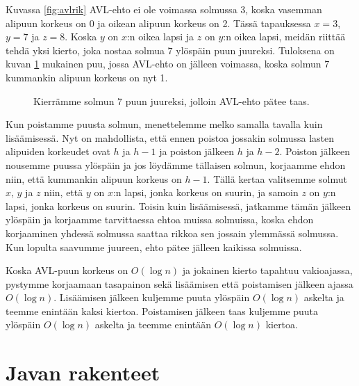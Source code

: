 Kuvassa \ref{fig:avlrik} AVL-ehto ei ole voimassa solmussa $3$,
koska vasemman alipuun korkeus on 0 ja oikean alipuun korkeus on 2.
Tässä tapauksessa $x=3$, $y=7$ ja $z=8$.
Koska $y$ on $x$:n oikea lapsi ja $z$ on $y$:n oikea lapsi,
meidän riittää tehdä yksi kierto, joka nostaa solmua $7$ ylöspäin
puun juureksi.
Tuloksena on kuvan \ref{fig:avlkor} mukainen puu, jossa
AVL-ehto on jälleen voimassa,
koska solmun $7$ kummankin alipuun korkeus on nyt 1.

\begin{figure}
\center
{}
\caption{Kierrämme solmun $7$ puun juureksi, jolloin AVL-ehto pätee taas.}
\label{fig:avlkor}
\end{figure}

Kun poistamme puusta solmun, menettelemme melko samalla tavalla
kuin lisäämisessä.
Nyt on mahdollista, että ennen poistoa
jossakin solmussa lasten alipuiden korkeudet ovat $h$ ja $h-1$
ja poiston jälkeen $h$ ja $h-2$.
Poiston jälkeen nousemme puussa ylöspäin ja jos löydämme
tällaisen solmun, korjaamme ehdon niin, että kummankin alipuun
korkeus on $h-1$.
Tällä kertaa valitsemme solmut $x$, $y$ ja $z$ niin,
että $y$ on $x$:n lapsi, jonka korkeus on suurin,
ja samoin $z$ on $y$:n lapsi, jonka korkeus on suurin.
Toisin kuin lisäämisessä, jatkamme tämän jälkeen ylöspäin
ja korjaamme tarvittaessa ehtoa muissa solmuissa,
koska ehdon korjaaminen yhdessä solmussa saattaa rikkoa
sen jossain ylemmässä solmussa.
Kun lopulta saavumme juureen, ehto pätee jälleen kaikissa solmuissa.

Koska AVL-puun korkeus on $O(\log n)$ ja jokainen kierto
tapahtuu vakioajassa,
pystymme korjaamaan tasapainon sekä lisäämisen että poistamisen
jälkeen ajassa $O(\log n)$.
Lisäämisen jälkeen kuljemme puuta ylöspäin $O(\log n)$ askelta
ja teemme enintään kaksi kiertoa.
Poistamisen jälkeen taas kuljemme puuta ylöspäin $O(\log n)$ askelta
ja teemme enintään $O(\log n)$ kiertoa.


\section{Javan rakenteet}

